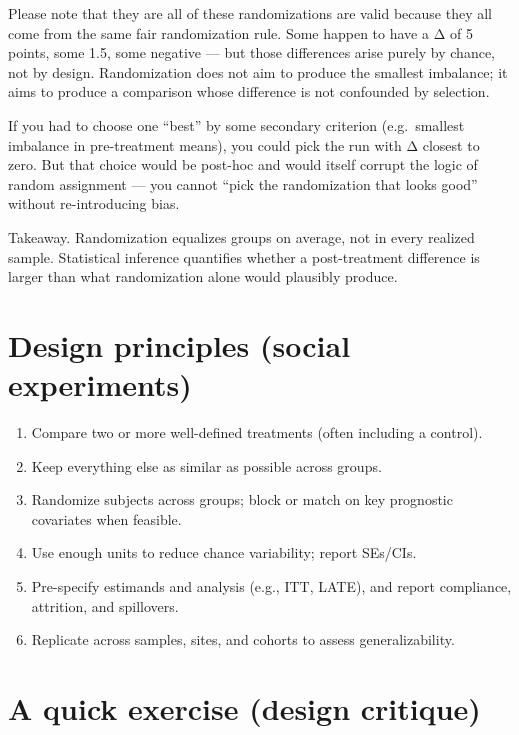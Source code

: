 \documentclass[
  letterpaper,
  DIV=11,
  numbers=noendperiod]{scrreprt}
\providecommand{\tightlist}{%
  \setlength{\itemsep}{0pt}\setlength{\parskip}{0pt}}
\begin{document}
Please note that they are all of these randomizations are valid because
they all come from the same fair randomization rule. Some happen to have
a Δ of 5 points, some 1.5, some negative --- but those differences arise
purely by chance, not by design. Randomization does not aim to produce
the smallest imbalance; it aims to produce a comparison whose difference
is not confounded by selection.

If you had to choose one ``best'' by some secondary criterion
(e.g.~smallest imbalance in pre-treatment means), you could pick the run
with Δ closest to zero. But that choice would be post-hoc and would
itself corrupt the logic of random assignment --- you cannot ``pick the
randomization that looks good'' without re-introducing bias.

Takeaway. Randomization equalizes groups on average, not in every
realized sample. Statistical inference quantifies whether a
post-treatment difference is larger than what randomization alone would
plausibly produce.

\section{Design principles (social
experiments)}\label{design-principles-social-experiments}

\begin{enumerate}
\def\labelenumi{\arabic{enumi}.}
\tightlist
\item
  Compare two or more well-defined treatments (often including a
  control).
\item
  Keep everything else as similar as possible across groups.
\item
  Randomize subjects across groups; block or match on key prognostic
  covariates when feasible.
\item
  Use enough units to reduce chance variability; report SEs/CIs.
\item
  Pre-specify estimands and analysis (e.g., ITT, LATE), and report
  compliance, attrition, and spillovers.
\item
  Replicate across samples, sites, and cohorts to assess
  generalizability.
\end{enumerate}

\section{A quick exercise (design
critique)}\label{a-quick-exercise-design-critique}
\end{document}
